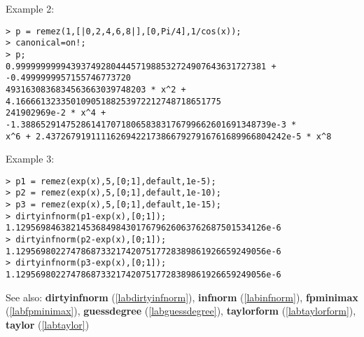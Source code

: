 \noindent Example 2: 
\begin{center}\begin{minipage}{15cm}\begin{Verbatim}[frame=single]
> p = remez(1,[|0,2,4,6,8|],[0,Pi/4],1/cos(x));
> canonical=on!;
> p;
0.99999999994393749280444571988532724907643631727381 + -0.4999999957155746773720
4931630836834563663039748203 * x^2 + 4.16666132335010905188253972212748718651775
241902969e-2 * x^4 + -1.38865291475286141707180658383176799662601691348739e-3 * 
x^6 + 2.437267919111162694221738667927916761689966804242e-5 * x^8
\end{Verbatim}
\end{minipage}\end{center}
\noindent Example 3: 
\begin{center}\begin{minipage}{15cm}\begin{Verbatim}[frame=single]
> p1 = remez(exp(x),5,[0;1],default,1e-5);
> p2 = remez(exp(x),5,[0;1],default,1e-10);
> p3 = remez(exp(x),5,[0;1],default,1e-15);
> dirtyinfnorm(p1-exp(x),[0;1]);
1.12956984638214536849843017679626063762687501534126e-6
> dirtyinfnorm(p2-exp(x),[0;1]);
1.12956980227478687332174207517728389861926659249056e-6
> dirtyinfnorm(p3-exp(x),[0;1]);
1.12956980227478687332174207517728389861926659249056e-6
\end{Verbatim}
\end{minipage}\end{center}
See also: \textbf{dirtyinfnorm} (\ref{labdirtyinfnorm}), \textbf{infnorm} (\ref{labinfnorm}), \textbf{fpminimax} (\ref{labfpminimax}), \textbf{guessdegree} (\ref{labguessdegree}), \textbf{taylorform} (\ref{labtaylorform}), \textbf{taylor} (\ref{labtaylor})
